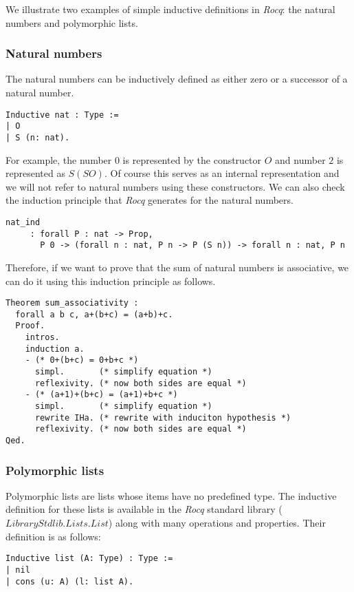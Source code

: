 We illustrate two examples of simple inductive definitions in \textit{Rocq}: the natural numbers and polymorphic lists.

\subsubsection{Natural numbers}
The natural numbers can be inductively defined as either zero or a successor of a natural number.
\begin{lstlisting}[language=Coq]
Inductive nat : Type :=
| O
| S (n: nat).
\end{lstlisting}

For example, the number $0$ is represented by the constructor \lst$O$ and number $2$ is represented as \lst$S (S O)$.
Of course this serves as an internal representation and we will not refer to natural numbers using these constructors.
We can also check the induction principle that \textit{Rocq} generates for the natural numbers.
\begin{lstlisting}[language=Coq]
  nat_ind
     : forall P : nat -> Prop,
       P 0 -> (forall n : nat, P n -> P (S n)) -> forall n : nat, P n
\end{lstlisting}

Therefore, if we want to prove that the sum of natural numbers is associative, we can do it using this induction principle as follows.
\begin{lstlisting}[language=Coq]
Theorem sum_associativity :
  forall a b c, a+(b+c) = (a+b)+c.
  Proof.
    intros.
    induction a.
    - (* 0+(b+c) = 0+b+c *)
      simpl.       (* simplify equation *)
      reflexivity. (* now both sides are equal *)        
    - (* (a+1)+(b+c) = (a+1)+b+c *)
      simpl.       (* simplify equation *)
      rewrite IHa. (* rewrite with induciton hypothesis *)
      reflexivity. (* now both sides are equal *)
Qed.
\end{lstlisting}

\subsubsection{Polymorphic lists}
Polymorphic lists are lists whose items have no predefined type.
The inductive definition for these lists is available in the \textit{Rocq} standard library (\lst$Library Stdlib.Lists.List$) along with many operations and properties.
Their definition is as follows: 

\begin{lstlisting}[language=Coq]
Inductive list (A: Type) : Type :=
| nil
| cons (u: A) (l: list A).
\end{lstlisting}

